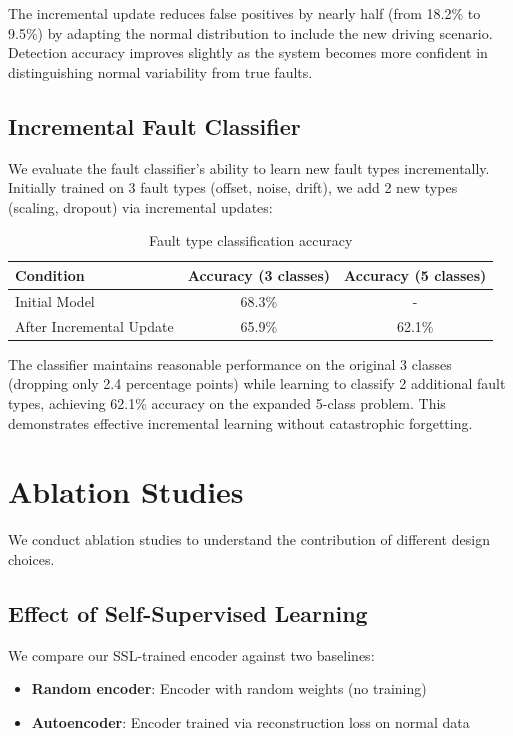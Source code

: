 The incremental update reduces false positives by nearly half (from 18.2\% to 9.5\%) by adapting the normal distribution to include the new driving scenario. Detection accuracy improves slightly as the system becomes more confident in distinguishing normal variability from true faults.

\subsection{Incremental Fault Classifier}

We evaluate the fault classifier's ability to learn new fault types incrementally. Initially trained on 3 fault types (offset, noise, drift), we add 2 new types (scaling, dropout) via incremental updates:

\begin{table}[htbp]
\centering
\caption{Fault type classification accuracy}
\label{tab:fault_classifier}
\begin{tabular}{@{}lcc@{}}
\toprule
Condition & Accuracy (3 classes) & Accuracy (5 classes) \\
\midrule
Initial Model & 68.3\% & - \\
After Incremental Update & 65.9\% & 62.1\% \\
\bottomrule
\end{tabular}
\end{table}

The classifier maintains reasonable performance on the original 3 classes (dropping only 2.4 percentage points) while learning to classify 2 additional fault types, achieving 62.1\% accuracy on the expanded 5-class problem. This demonstrates effective incremental learning without catastrophic forgetting.

\section{Ablation Studies}

We conduct ablation studies to understand the contribution of different design choices.

\subsection{Effect of Self-Supervised Learning}

We compare our SSL-trained encoder against two baselines:
\begin{itemize}
    \item \textbf{Random encoder}: Encoder with random weights (no training)
    \item \textbf{Autoencoder}: Encoder trained via reconstruction loss on normal data
\end{itemize}


